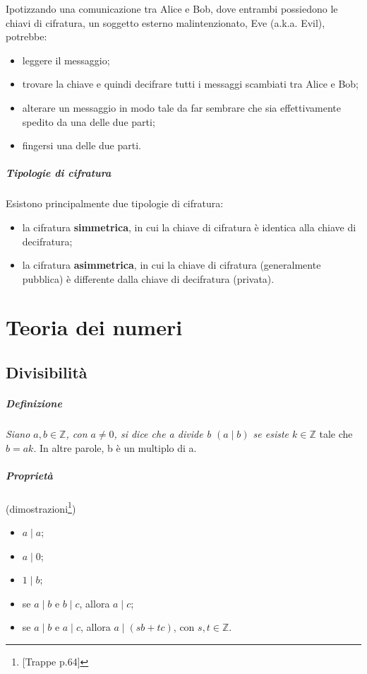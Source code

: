 \documentclass[a4paper]{report}
\begin{document}
Ipotizzando una comunicazione tra Alice e Bob, dove entrambi possiedono le chiavi di cifratura, un soggetto esterno malintenzionato, Eve (a.k.a. Evil), potrebbe:
\begin{itemize}
\item leggere il messaggio;
\item trovare la chiave e quindi decifrare tutti i messaggi scambiati tra Alice e Bob;
\item alterare un messaggio in modo tale da far sembrare che sia effettivamente spedito da una delle due parti;
\item fingersi una delle due parti.
\end{itemize}
\paragraph{Tipologie di cifratura}
Esistono principalmente due tipologie di cifratura:
\begin{itemize}
\item la cifratura \textbf{simmetrica}, in cui la chiave di cifratura è identica alla chiave di decifratura;
\item la cifratura \textbf{asimmetrica}, in cui la chiave di cifratura (generalmente pubblica) è differente dalla chiave di decifratura (privata).
\end{itemize}
\chapter{Teoria dei numeri}
\section{Divisibilità}
\paragraph{Definizione}
\textit{Siano $a,b\in \mathbb{Z}$, con $a\neq 0$, si dice che a divide b $(a\mid b)$ se esiste $k\in \mathbb{Z}$} tale che $b=ak$. In altre parole, b è un multiplo di a.
\paragraph{Proprietà} (dimostrazioni\footnote{[Trappe p.64]})
\begin{itemize}
\item $a\mid a$;
\item $a\mid 0$;
\item $1\mid b$;
\item se $a\mid b$ e $b\mid c$, allora $a\mid c$;
\item se $a\mid b$ e $a\mid c$, allora $a\mid (sb + tc)$, con $s,t\in \mathbb{Z}$.
\end{itemize}
\end{document}
